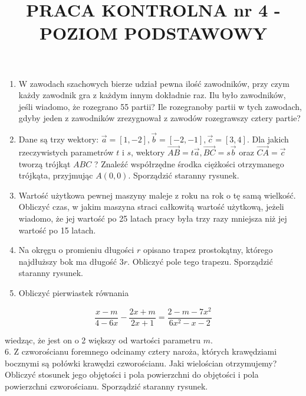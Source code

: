 \documentclass[10pt]{article}
\title{PRACA KONTROLNA nr 4 - POZIOM PODSTAWOWY }
\author{}
\date{}
\begin{document}
\maketitle
\begin{enumerate}
  \item W zawodach szachowych bierze udział pewna ilość zawodników, przy czym każdy zawodnik gra z każdym innym dokładnie raz. Ilu było zawodników, jeśli wiadomo, że rozegrano 55 partii? Ile rozegranoby partii w tych zawodach, gdyby jeden z zawodników zrezygnował z zawodów rozegrawszy cztery partie?
  \item Dane są trzy wektory: $\vec{a}=[1,-2], \vec{b}=[-2,-1], \vec{c}=[3,4]$. Dla jakich rzeczywistych parametrów $t$ i $s$, wektory $\overrightarrow{A B}=t \vec{a}, \overrightarrow{B C}=s \vec{b}$ oraz $\overrightarrow{C A}=\vec{c}$ tworzą trójkąt $A B C$ ? Znaleźć współrzędne środka ciężkości otrzymanego trójkąta, przyjmując $A(0,0)$. Sporządzić staranny rysunek.
  \item Wartość użytkowa pewnej maszyny maleje z roku na rok o tę samą wielkość. Obliczyć czas, w jakim maszyna straci całkowitą wartość użytkową, jeżeli wiadomo, że jej wartość po 25 latach pracy była trzy razy mniejsza niż jej wartość po 15 latach.
  \item Na okręgu o promieniu długości $r$ opisano trapez prostokątny, którego najdłuższy bok ma długość $3 r$. Obliczyć pole tego trapezu. Sporządzić staranny rysunek.
  \item Obliczyć pierwiastek równania
\end{enumerate}

$$
\frac{x-m}{4-6 x}-\frac{2 x+m}{2 x+1}=\frac{2-m-7 x^{2}}{6 x^{2}-x-2}
$$

wiedząc, że jest on o 2 większy od wartości parametru $m$.\\
6. Z czworościanu foremnego odcinamy cztery naroża, których krawędziami bocznymi są połówki krawędzi czworościanu. Jaki wielościan otrzymujemy? Obliczyć stosunek jego objętości i pola powierzchni do objętości i pola powierzchni czworościanu. Sporządzić staranny rysunek.
\end{document}
